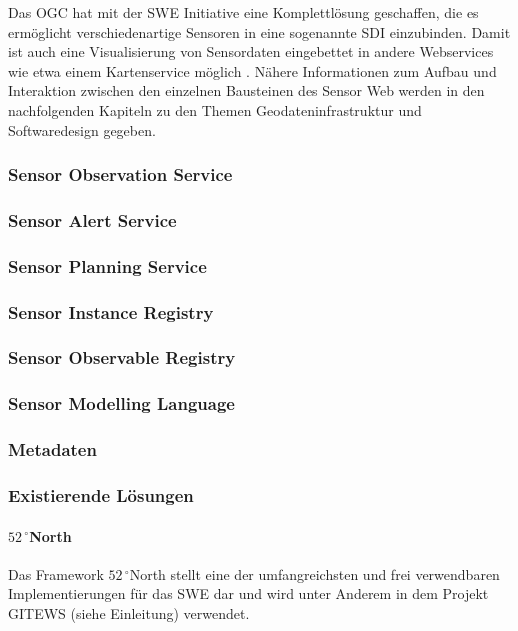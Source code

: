 \citep{botts_ogc_2008}\citep{woolf_gigas_2008}\citep{kunkel_teodoor:_2012}\citep{walkowski_sensor_2008}

Das \gls{OGC} hat mit der \gls{SWE} Initiative eine Komplettlösung geschaffen, die es ermöglicht verschiedenartige Sensoren in eine sogenannte  \gls{SDI} einzubinden. Damit ist auch eine Visualisierung von Sensordaten eingebettet in andere Webservices wie etwa einem Kartenservice möglich \citep{broring_new_2011}. Nähere Informationen zum Aufbau und Interaktion zwischen den einzelnen Bausteinen des Sensor Web werden in den nachfolgenden Kapiteln zu den Themen Geodateninfrastruktur und Softwaredesign gegeben.

\subsubsection{Sensor Observation Service}
\subsubsection{Sensor Alert Service}
\subsubsection{Sensor Planning Service}
\subsubsection{Sensor Instance Registry}
\subsubsection{Sensor Observable Registry}
\subsubsection{Sensor Modelling Language}
\subsubsection{Metadaten}

\subsubsection{Existierende Lösungen}
\paragraph{$52\,^{\circ}$North}
Das Framework $52\,^{\circ}$North stellt eine der umfangreichsten und frei verwendbaren Implementierungen für das \gls{SWE} dar und wird unter Anderem in dem Projekt \gls{GITEWS} (siehe Einleitung) verwendet.

